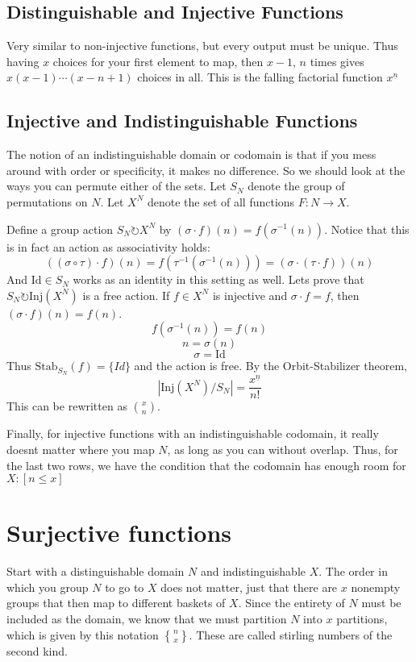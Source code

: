 \documentclass{article}
\begin{document}
\subsection*{Distinguishable and Injective Functions}
Very similar to non-injective functions, but every output must be unique. Thus having $x$ choices for your first element to map, then
$x-1$, $n$ times gives $x(x-1)\cdots(x-n+1)$ choices in all. This is the falling factorial function $x^{\underline{n}}$
\subsection*{Injective and Indistinguishable Functions}
The notion of an indistinguishable domain or codomain is that if you mess around with order or specificity, it makes no difference. So 
we should look at the ways you can permute either of the sets. Let $S_N$ denote the group of permutations on $N$. Let $X^N$ denote the set of all functions $F: N \to X$.
\vspace{0.5em}

Define a group action $S_N \circlearrowright X^N$ by $(\sigma \cdot f)(n) = f(\sigma^{-1}(n))$. Notice that this is in fact an action as associativity holds:
\[((\sigma \circ \tau) \cdot f)(n) = f(\tau^{-1}(\sigma^{-1}(n))) = (\sigma \cdot (\tau \cdot f))(n)\]
And $\text{Id} \in S_N$ works as an identity in this setting as well.
\vspace{0.5em}
Lets prove that $S_N \circlearrowright \text{Inj}(X^N)$ is a free action. If $f \in X^N$ is injective
and $\sigma \cdot f = f$, then $(\sigma \cdot f)(n) = f(n)$. 
\[f(\sigma^{-1}(n)) = f(n)\]
\[n = \sigma(n)\]
\[\sigma = \text{Id}\]
Thus $\text{Stab}_{S_N}(f) = \{Id\}$ and the action is free. By the Orbit-Stabilizer theorem,
\[\left| {\text{Inj}(X^N)} / {S_N} \right| = \frac{x^{\underline{n}}}{n!}\]
This can be rewritten as ${x \choose n}$.
\vspace*{1em}

Finally, for injective functions with an indistinguishable codomain, it really doesnt matter where 
you map $N$, as long as you can without overlap. Thus, for the last two rows, we have the condition that the
codomain has enough room for $X: [n \leq x]$

\section{Surjective functions}
Start with a distinguishable domain $N$ and indistinguishable $X$. The order in which you group $N$ to go to $X$ does not matter, just that
there are $x$ nonempty groups that then map to different baskets of $X$. Since the entirety of $N$ must be included as the domain, we know that we
must partition $N$ into $x$ partitions, which is given by this notation ${n \brace x}$. These are called stirling numbers of the second kind.
\vspace*{0.5em}
\end{document}

